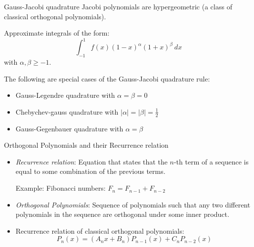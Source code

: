 \documentclass[xcolor=pdftex,table,10pt,yellow,mathserif]{beamer}
\begin{document}
\begin{frame}{Gauss-Jacobi quadrature}
    Jacobi polynomials are hypergeometric (a class of classical orthogonal polynomials).

    Approximate integrals of the form: 
    \[
        \int_{-1}^{1} f(x)(1-x)^\alpha (1 + x)^\beta \ dx    
    \]
    with $\alpha, \beta \geq -1$.

    The following are special cases of the Gauss-Jacobi quadrature rule:
    \begin{itemize}
        \item Gauss-Legendre quadrature with $\alpha = \beta = 0$
        \item Chebychev-gauss quadrature with $|\alpha| = |\beta| = \frac{1}{2}$
        \item Gauss-Gegenbauer quadrature with $\alpha = \beta$
    \end{itemize}
\end{frame}

\begin{frame}{Orthogonal Polynomials and their Recurrence relation}
    \begin{itemize}
        \item \emph{Recurrence relation}: Equation that states that the $n$-th term of a sequence is equal to some combination of the previous terms.
        

            Example: \pause Fibonacci numbers: $F_n =  F_{n-1} + F_{n-2}$

            \pause

        \item \emph{Orthogonal Polynomials}: Sequence of polynomials such that any two different polynomials in the sequence are orthogonal under some inner product.
    
        \item Recurrence relation of classical orthogonal polynomials:
            \[
                P_n(x) = (A_n x + B_n)P_{n-1}(x) + C_n P_{n-2}(x)
            \]
    \end{itemize}
    
\end{frame}
\end{document}
